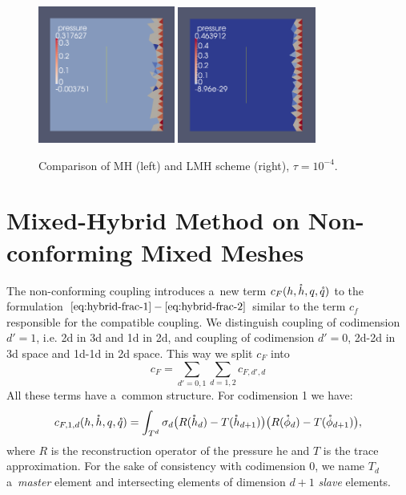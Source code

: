 \begin{figure}
    \begin{center}
       \includegraphics[width=0.4\textwidth]{figures/MH.png}
       \includegraphics[width=0.405\textwidth]{figures/LMH.png}        
    \end{center}
    \caption{Comparison of MH (left) and LMH scheme (right), $\tau=10^{-4}$.}
    \label{fig:LMH}
\end{figure}

\section{Mixed-Hybrid Method on Non-conforming Mixed Meshes}
The non-conforming coupling introduces a~new term $c_F(h, \mathring h, q, \mathring q)$ to the formulation $\eqref{eq:hybrid-frac-1} - 
\eqref{eq:hybrid-frac-2}$ similar to the term $c_f$ responsible for the compatible coupling. We distinguish coupling of codimension $d'=1$, i.e. 2d in 3d and 1d in 2d,
and coupling of codimension $d'=0$, 2d-2d in 3d space and 1d-1d in 2d space. This way we split $c_F$ into
\[
    c_F= \sum_{d'=0,1} \sum_{d=1,2} c_{F,d',d}
\]
All these terms have a~common structure. For codimension 1 we have:
\begin{equation*}
  c_{F,1,d}(h, \mathring h, q, \mathring q) =  \int_{T^d} \sigma_d
                \big(R({\mathring{h}_d}) - T({\mathring{h}_{d+1}}) \big)
                 \big(R({\mathring{\phi}_d}) - T({\mathring{\phi}_{d+1}}) \big),
\end{equation*}
where $R$ is the reconstruction operator of the pressure he and $T$ is the trace approximation.
For the sake of consistency with codimension $0$, we name $T_d$ a~\emph{master} element and 
intersecting elements of dimension $d+1$ \emph{slave} elements.


